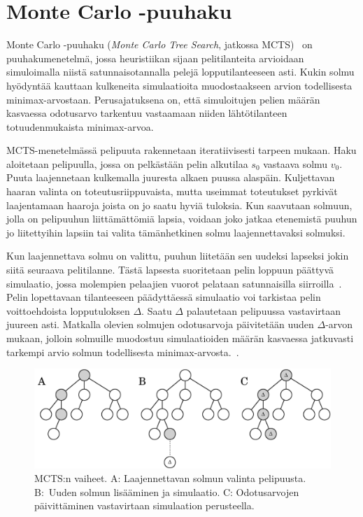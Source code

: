 \documentclass[12pt,finnish]{tktltiki2}
\theoremstyle{definition}
\theoremstyle{remark}
\begin{document}
\section{Monte Carlo -puuhaku}

Monte Carlo -puuhaku (\textit{Monte Carlo Tree Search}, jatkossa MCTS)~\cite{browne} on puuhakumenetelmä, jossa heuristiikan sijaan pelitilanteita arvioidaan simuloimalla niistä satunnaisotannalla pelejä lopputilanteeseen asti. Kukin solmu hyödyntää kauttaan kulkeneita simulaatioita muodostaakseen arvion todellisesta minimax-arvostaan. Perusajatuksena on, että simuloitujen pelien määrän kasvaessa odotusarvo tarkentuu vastaamaan niiden lähtötilanteen totuudenmukaista minimax-arvoa.

MCTS-menetelmässä pelipuuta rakennetaan iteratiivisesti tarpeen mukaan. Haku aloitetaan pelipuulla, jossa on pelkästään pelin alkutilaa $s_0$ vastaava solmu $v_0$. Puuta laajennetaan kulkemalla juuresta alkaen puussa alaspäin. Kuljettavan haaran valinta on toteutusriippuvaista, mutta useimmat toteutukset pyrkivät laajentamaan haaroja joista on jo saatu hyviä tuloksia. Kun saavutaan solmuun, jolla on pelipuuhun liittämättömiä lapsia, voidaan joko jatkaa etenemistä puuhun jo liitettyihin lapsiin tai valita tämänhetkinen solmu laajennettavaksi solmuksi.

Kun laajennettava solmu on valittu, puuhun liitetään sen uudeksi lapseksi jokin siitä seuraava pelitilanne. Tästä lapsesta suoritetaan pelin loppuun päättyvä simulaatio, jossa molempien pelaajien vuorot pelataan satunnaisilla siirroilla~\cite{browne}. Pelin lopettavaan tilanteeseen päädyttäessä simulaatio voi tarkistaa pelin voittoehdoista lopputuloksen $\Delta$. Saatu $\Delta$ palautetaan pelipuussa vastavirtaan juureen asti. Matkalla olevien solmujen odotusarvoja päivitetään uuden $\Delta$-arvon mukaan, jolloin solmuille muodostuu simulaatioiden määrän kasvaessa jatkuvasti tarkempi arvio solmun todellisesta minimax-arvosta.~\cite{browne}.

\begin{figure}

\includegraphics[width = \textwidth]{basicmcts.png}

\caption{MCTS:n vaiheet. A: Laajennettavan solmun valinta pelipuusta. B:~Uuden solmun lisääminen ja simulaatio. C: Odotusarvojen päivittäminen vastavirtaan simulaation perusteella.}
\end{figure}
\end{document}
